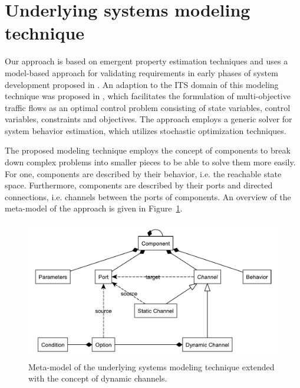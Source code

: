 \section{Underlying systems modeling technique}
\label{section:contribution_0}

Our approach is based on emergent property estimation techniques \cite{hackenberg2012towards} and uses a model-based approach for validating requirements in early phases of system development proposed in \cite{hackenberg2014rapid}. An adaption to the ITS domain of this modeling technique was proposed in \cite{ascher2014early}, which facilitates the formulation of multi-objective traffic flows as an optimal control problem consisting of state variables, control variables, constraints and objectives. The approach employs a generic solver for system behavior estimation, which utilizes stochastic optimization techniques.

The proposed modeling technique employs the concept of components to break down complex problems into smaller pieces to be able to solve them more easily. For one, components are described by their behavior, i.e. the reachable state space. Furthermore, components are described by their ports and directed connections, i.e. channels between the ports of components. An overview of the meta-model of the approach is given in Figure~\ref{fig:meta_model}.

\begin{figure}[h]
	\centering
	\includegraphics[width=\columnwidth]{../gfx/meta_model2.pdf}
	\caption{Meta-model of the underlying systems modeling technique extended with the concept of dynamic channels.}
	\label{fig:meta_model}
\end{figure}

